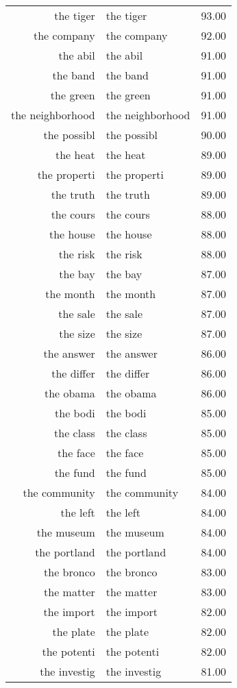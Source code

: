 \begin{table}[ht]
\begin{tabular}{rlr}
  the tiger & the tiger & 93.00 \\ 
  the company & the company & 92.00 \\ 
  the abil & the abil & 91.00 \\ 
  the band & the band & 91.00 \\ 
  the green & the green & 91.00 \\ 
  the neighborhood & the neighborhood & 91.00 \\ 
  the possibl & the possibl & 90.00 \\ 
  the heat & the heat & 89.00 \\ 
  the properti & the properti & 89.00 \\ 
  the truth & the truth & 89.00 \\ 
  the cours & the cours & 88.00 \\ 
  the house & the house & 88.00 \\ 
  the risk & the risk & 88.00 \\ 
  the bay & the bay & 87.00 \\ 
  the month & the month & 87.00 \\ 
  the sale & the sale & 87.00 \\ 
  the size & the size & 87.00 \\ 
  the answer & the answer & 86.00 \\ 
  the differ & the differ & 86.00 \\ 
  the obama & the obama & 86.00 \\ 
  the bodi & the bodi & 85.00 \\ 
  the class & the class & 85.00 \\ 
  the face & the face & 85.00 \\ 
  the fund & the fund & 85.00 \\ 
  the community & the community & 84.00 \\ 
  the left & the left & 84.00 \\ 
  the museum & the museum & 84.00 \\ 
  the portland & the portland & 84.00 \\ 
  the bronco & the bronco & 83.00 \\ 
  the matter & the matter & 83.00 \\ 
  the import & the import & 82.00 \\ 
  the plate & the plate & 82.00 \\ 
  the potenti & the potenti & 82.00 \\ 
  the investig & the investig & 81.00 \\ 

\end{tabular}
\end{table}
